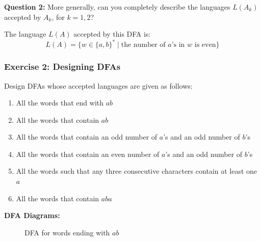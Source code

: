 \documentclass{article}
\theoremstyle{theorem}
\theoremstyle{definition}
\theoremstyle{remark}
\begin{document}
\textbf{Question 2:} More generally, can you completely describe the languages $L(A_k)$ accepted by $A_k$, for $k = 1, 2$?

The language $L(A)$ accepted by this DFA is:
$$L(A) = \{ w \in \{a,b\}^* \mid \text{the number of } a \text{'s in } w \text{ is even} \}$$

\subsubsection{Exercise 2: Designing DFAs}

Design DFAs whose accepted languages are given as follows:

\begin{enumerate}
  \item All the words that end with $ab$
  \item All the words that contain $ab$
  \item All the words that contain an odd number of $a$'s and an odd number of $b$'s
  \item All the words that contain an even number of $a$'s and an odd number of $b$'s
  \item All the words such that any three consecutive characters contain at least one $a$
  \item All the words that contain $aba$
\end{enumerate}

\textbf{DFA Diagrams:}

\begin{figure}[H]
  \centering
  \caption{DFA for words ending with $ab$}
\end{figure}
\end{document}
